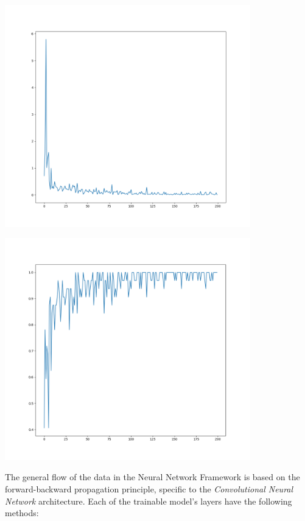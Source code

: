 \begin{center}
	\centering
	\includegraphics[width = 4.2in]{images/metrics.png}
	\centerline{}
\label{good_metrics}
\end{center}


\begin{center}
	\centering
	\includegraphics[width = 4.2in]{images/goodacc.png}
	\centerline{}
\label{good_metrics2}
\end{center}

The general flow of the data in the Neural Network Framework is based on the forward-backward propagation principle,
specific to the \textit{Convolutional Neural Network} architecture.
Each of the trainable model's layers have the following methods:

